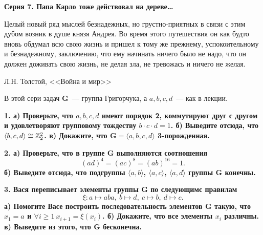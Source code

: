 \documentclass[12pt]{article}
\begin{document}
	\centerline{\bf{Серия 7. Папа Карло тоже действовал на дереве\ldots  }}

	\epigraph{Целый новый ряд мыслей безнадежных, но грустно-приятных в связи с этим дубом возник в душе князя Андрея. Во время этого путешествия он как будто вновь обдумал всю свою жизнь и пришел к тому же прежнему, успокоительному и безнадежному, заключению, что ему начинать ничего было не надо, что он должен доживать свою жизнь, не делая зла, не тревожась и ничего не желая.}{Л.Н. Толстой, <<Война и мир>>}

	В этой сери задач $\mathbf{G}$~--- группа Григорчука, а $a, b, c, d$~--- как в лекции. 

	\bf{1.} а) Проверьте, что $a, b, c, d$ имеют порядок 2, коммутируют друг с другом и удовлетворяют групповому тождеству  $b \cdot c \cdot d = 1$. б) Выведите отсюда, что $\langle b, c, d \rangle \cong \mathbb{Z}_{2}^2$. в) Докажите, что $\mathbf{G} = \langle a, b, c, d \rangle$ 3-порожденная. 
	
	\bf{2.} а) Проверьте, что в группе $\mathbf{G}$ выполняются соотношения 
	\[
		(ad)^4 = (ac)^8 = (ab)^{16} = 1.
	\]
	б) Выведите отсюда, что подгруппы $\langle a, b \rangle$, $\langle a, c \rangle$, $\langle a, d \rangle$ группы $\mathbf{G}$ конечны. 

	\bf{3.} Вася переписывает элементы группы $\mathbf{G}$ по следующимс правилам
	\[
		\xi\colon a \mapsto aba, \ b \mapsto d, \ c \mapsto b, \ d \mapsto c.
	\]
	а) Помогите Васе построить последовательность элементов $\mathbf{G}$ такую, что $x_1 = a$ и $\forall i \ge 1 \ x_{i + 1} = \xi(x_{i})$. б) Докажите, что все элементы $x_i$ различны. в) Выведите из этого, что  $\mathbf{G}$ бесконечна.
\end{document}
